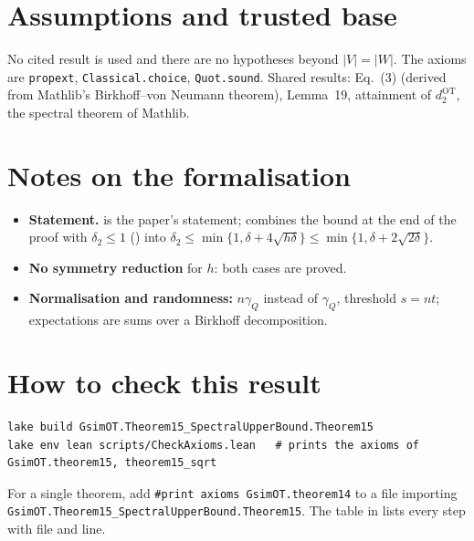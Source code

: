 \section{Assumptions and trusted base}
No cited result is used and there are no hypotheses beyond $|V|=|W|$. The axioms are \texttt{propext},
\texttt{Classical.choice}, \texttt{Quot.sound}. Shared results: Eq.~(3) (derived from Mathlib's Birkhoff--von
Neumann theorem), Lemma~19, attainment of $d^{\mathrm{OT}}_2$, the spectral theorem of Mathlib.

\section{Notes on the formalisation}
\begin{itemize}
\item \textbf{Statement.}  is the paper's statement;  combines the bound
   at the end of the proof with $\delta_2\le1$ () into
  $\delta_2\le\min\{1,\delta+4\sqrt{h\delta}\}\le\min\{1,\delta+2\sqrt{2\delta}\}$.
\item \textbf{No symmetry reduction} for $h$: both cases are proved.
\item \textbf{Normalisation and randomness:} $n\gamma_Q$ instead of $\gamma_Q$, threshold $s=nt$; expectations are
  sums over a Birkhoff decomposition.
\end{itemize}

\section{How to check this result}
\begin{verbatim}
lake build GsimOT.Theorem15_SpectralUpperBound.Theorem15
lake env lean scripts/CheckAxioms.lean   # prints the axioms of GsimOT.theorem15, theorem15_sqrt
\end{verbatim}
For a single theorem, add \verb|#print axioms GsimOT.theorem14| to a file importing
\verb|GsimOT.Theorem15_SpectralUpperBound.Theorem15|. The table in  lists every
step with file and line.

